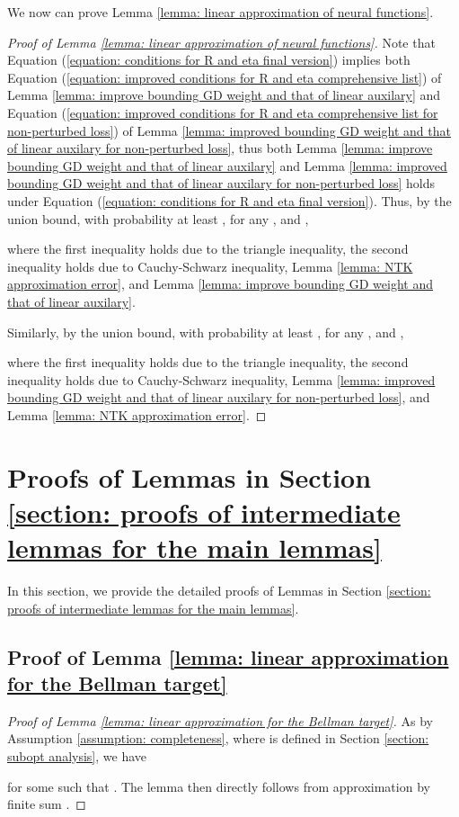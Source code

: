 \documentclass{article} \usepackage{iclr2023/iclr2023_conference,times}
\begin{document}
We now can prove Lemma \ref{lemma: linear approximation of neural functions}.
\begin{proof}[Proof of Lemma \ref{lemma: linear approximation of neural functions}]
Note that Equation (\ref{equation: conditions for R and eta final version}) implies both Equation (\ref{equation: improved conditions for R and eta comprehensive list}) of Lemma \ref{lemma: improve bounding GD weight and that of linear auxilary} and Equation (\ref{equation: improved conditions for R and eta comprehensive list for non-perturbed loss}) of Lemma \ref{lemma: improved bounding GD weight and that of linear auxilary for non-perturbed loss}, thus both  Lemma \ref{lemma: improve bounding GD weight and that of linear auxilary} and Lemma \ref{lemma: improved bounding GD weight and that of linear auxilary for non-perturbed loss} holds under Equation (\ref{equation: conditions for R and eta final version}). Thus, by the union bound, with probability at least , for any , and ,

where the first inequality holds due to the triangle inequality, the second inequality holds due to Cauchy-Schwarz inequality, Lemma \ref{lemma: NTK approximation error}, and Lemma \ref{lemma: improve bounding GD weight and that of linear auxilary}. 

Similarly, by the union bound, with probability at least , for any , and ,

where the first inequality holds due to the triangle inequality, the second inequality holds due to Cauchy-Schwarz inequality, Lemma \ref{lemma: improved bounding GD weight and that of linear auxilary for non-perturbed loss}, and Lemma \ref{lemma: NTK approximation error}. 
\end{proof}




 \section{Proofs of Lemmas in Section \ref{section: proofs of intermediate lemmas for the main lemmas}}
\label{section: proof of intermediate lemmas of intermediate lemmas}
In this section, we provide the detailed proofs of Lemmas in Section \ref{section: proofs of intermediate lemmas for the main lemmas}. 

\subsection{Proof of Lemma \ref{lemma: linear approximation for the Bellman target}}
\begin{proof}[Proof of Lemma \ref{lemma: linear approximation for the Bellman target}]
As  by Assumption \ref{assumption: completeness}, where  is defined in Section \ref{section: subopt analysis},
we have 

for some  such that . The lemma then directly follows from approximation by finite sum \citep{gao2019convergence}. 
\end{proof}
\end{document}
